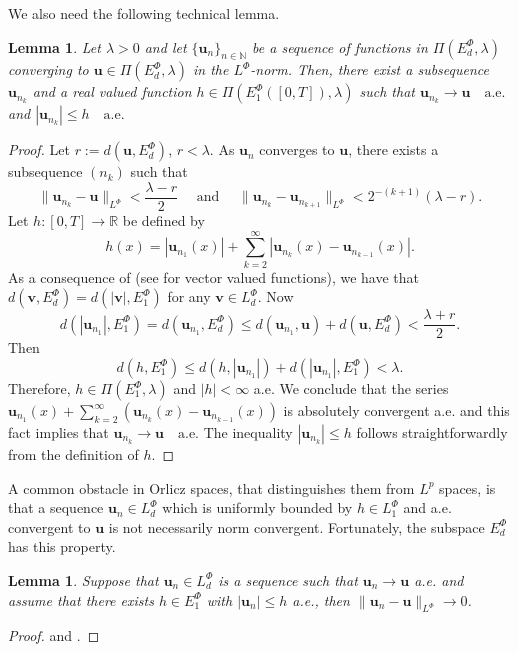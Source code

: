 \documentclass[twoside]{elsarticle}
\newtheorem{lem}[thm]{Lemma}
\theoremstyle{remark}
\newcommand{\orlnor}{\|_{L^{\Phi}}}
\newcommand{\lphi}{L^{\Phi}}
\newcommand{\ephi}{E^{\Phi}}
\renewcommand{\b}[1]{\boldsymbol{#1}}
\renewcommand{\leq}{\leqslant}
\begin{document}
We also need the following technical lemma.
\begin{lem}\label{segundo lema}
Let $\lambda>0$ and let $\{\b{u}_n\}_{n\in \mathbb{N}}$ be a sequence of  functions in $\Pi(\ephi_d,\lambda)$ converging to  $\b{u}\in \Pi(\ephi_d,\lambda)$  in the $\lphi$-norm. Then, there exist a subsequence
$\b{u}_{n_k}$ and a real valued function $h\in\Pi\left(\ephi_1\left([0,T]\right),\lambda\right)$ such that $\b{u}_{n_k}\rightarrow \b{u} \quad\text{a.e.}$ and $|\b{u}_{n_k}|\leq h\quad\text{a.e.}$
\end{lem}



\begin{proof}
Let $r:=d(\b{u},\ephi_d)$, $r<\lambda$. As $\b{u}_n$ converges to $\b{u}$, there exists a subsequence $(n_k)$ such that
\[\|\b{u}_{n_k}-\b{u}\orlnor<\frac{\lambda-r}{2}\quad \text{ and }\quad \|\b{u}_{n_k}-\b{u}_{n_{k+1}}\orlnor<2^{-(k+1)}(\lambda-r).\]
Let $h:[0,T]\rightarrow\mathbb{R}$ be  defined by
\begin{equation}\label{serie} h(x)=|\b{u}_{n_1}(x)|+\sum_{k=2}^{\infty}|\b{u}_{n_k}(x)-\b{u}_{n_{k-1}}(x)|.
\end{equation}
As a consequence  of \cite[Lemma 10.1]{KR} (see \cite[Thm. 5.5]{Orliczvectorial2005} for vector valued functions),  we have that $d(\b{v},\ephi_d)=d(|\b{v}|,\ephi_1)$ for any $\b{v}\in\lphi_d$. 
Now
\[d(|\b{u}_{n_1}|,\ephi_1)= d(\b{u}_{n_1},\ephi_d)\leq d(\b{u}_{n_1},\b{u})+d(\b{u},\ephi_d)<\frac{\lambda+r}{2}.\]
Then
\[d(h,\ephi_1)\leq d(h,|\b{u}_{n_1}|)+d(|\b{u}_{n_1}|,\ephi_1)< \lambda.\]
Therefore, $h\in\Pi(\ephi_1,\lambda)$ and  $|h|<\infty$ a.e. 
We conclude that the series  $\b{u}_{n_1}(x)+\sum_{k=2}^{\infty}(\b{u}_{n_k}(x)-\b{u}_{n_{k-1}}(x))$
is absolutely convergent a.e. and this fact implies that $\b{u}_{n_k}\rightarrow \b{u} \quad\text{a.e.}$ 
The inequality $|\b{u}_{n_k}|\leq h$ follows straightforwardly from the definition of $h$.
\end{proof}

A common obstacle in Orlicz spaces, that distinguishes them from $L^p$ spaces, is that a  sequence $\b{u}_n\in\lphi_d$ which is  uniformly bounded by $ h\in\lphi_1$ and a.e. convergent to $\b{u}$ is not necessarily norm convergent.
Fortunately, the subspace $\ephi_d$ has this property. 

\begin{lem}\label{lema_conv_may}
Suppose that $\b{u}_n \in\lphi_d$ is a sequence such that $\b{u}_n\to \b{u}$ a.e. and assume that there exists $h\in\ephi_1$ with $|\b{u}_n|\leq h$ a.e., 
then $\|\b{u}_n-\b{u}\orlnor\to 0$.
\end{lem}
\begin{proof}\cite[p. 84]{rao1991theory} and \cite[Thm. 10.3]{KR}.
\end{proof}
\end{document}
